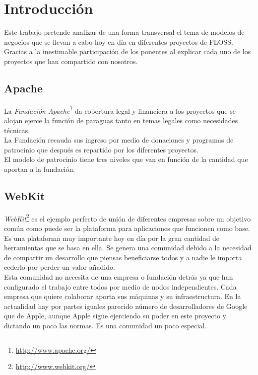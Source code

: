 \documentclass[12pt]{article} %
\begin{document}
\tableofcontents %

\newpage %


\section{Introducción} %

Este trabajo pretende analizar de una forma transversal el tema de modelos de negocios que se llevan a cabo hoy en día en diferentes proyectos de FLOSS. \\ Gracias a la inestimable participación de los ponentes al explicar cada uno de los proyectos que han compartido con nosotros.

\subsection{Apache} %

La \emph{Fundación Apache}\footnote{\url{http://www.apache.org/}} da cobertura legal y financiera a los proyectos que se alojan ejerce la función de paraguas tanto en temas legales como necesidades técnicas. \\ La Fundación recauda sus ingreso por medio de donaciones y programas de patrocinio que después es repartido por los diferentes proyectos.\\El modelo de patrocinio tiene tres niveles que van en función de la cantidad que aportan a la fundación.

\subsection{WebKit} %

\emph{WebKit}\footnote{\url{http://www.webkit.org/}} es el ejemplo perfecto de unión de diferentes empresas sobre un objetivo común como puede ser la plataforma para aplicaciones que funcionen como base.\\Es una plataforma muy importante hoy en día por la gran cantidad de herramientas que se basa en ella. Se genera una comunidad debido a la necesidad de compartir un desarrollo que piensas beneficiarse todos y a nadie le importa cederlo por perder un valor añadido.\\Esta comunidad no necesita de una empresa o fundación detrás ya que han configurado el trabajo entre todos por medio de nodos independientes. Cada empresa que quiere colaborar aporta sus máquinas y su infraestructura. En la actualidad hay por partes iguales parecido número de desarrolladores de Google que de Apple, aunque Apple sigue ejerciendo su poder en este proyecto y dictando un poco las normas. Es una comunidad un poco especial.
\end{document}
